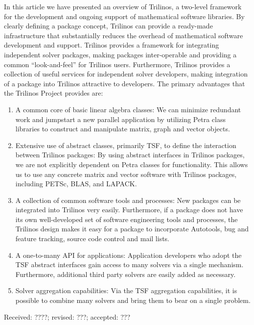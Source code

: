\documentclass[acmtoms,acmnow]{acmtrans2m}
\newcommand{\bsinglespace}{\renewcommand{\baselinestretch}{1.2}\small\normalsize}
\newcommand{\esinglespace}{}
\begin{document}
In this article we have presented an overview of Trilinos, a two-level
framework for the development and ongoing support of mathematical
software libraries.  By clearly defining a package concept, Trilinos can
provide a ready-made infrastructure that substantially reduces the overhead of
mathematical software development and support.
Trilinos provides a framework for integrating independent 
solver packages, making packages inter-operable and providing a 
common ``look-and-feel'' 
for Trilinos users.  Furthermore, Trilinos provides a collection 
of useful services for
independent solver developers, making integration of a package into 
Trilinos 
attractive to developers.
The primary advantages that the Trilinos Project provides are:
\begin{enumerate}
\item A common core of basic linear algebra classes:
We can minimize redundant work and jumpstart a new parallel application
by utilizing Petra class libraries to construct 
and manipulate matrix, graph and vector objects.
\item Extensive use of abstract classes, primarily TSF, to define the 
interaction between Trilinos
packages:  By using abstract interfaces in Trilinos packages, we are
not explicitly dependent on Petra classes for functionality.  
This allows us to use any
concrete matrix and vector software with Trilinos packages, 
including PETSc, BLAS, 
and LAPACK.
\item A collection of common software tools and processes: New packages can be 
integrated into Trilinos very easily.  Furthermore, if a package 
does not have its own well-developed set of software engineering tools
and processes, the Trilinos design makes it easy for a package to 
incorporate Autotools, bug and feature tracking,
source code control and mail lists.
\item A one-to-many API for applications: Application developers who 
adopt the TSF abstract interfaces gain access to many solvers via a 
single mechanism.  Furthermore, additional third
party solvers are easily added as necessary.
\item Solver aggregation capabilities:  Via the TSF aggregation 
capabilities, it is possible
to combine many solvers and bring them to bear on a single problem.
\end{enumerate}

{\bsinglespace

\nopagebreak
\scriptsize

\esinglespace}

\begin{received}
Received: ????; revised: ???; accepted: ???
\end{received}
\end{document}
